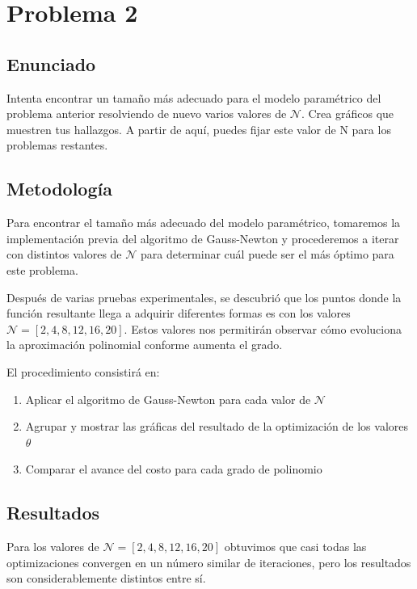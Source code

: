 \documentclass{article}
\begin{document}
\section{Problema 2}

\subsection{Enunciado}

Intenta encontrar un tamaño más adecuado para el modelo paramétrico del problema anterior resolviendo de nuevo varios valores de $\mathcal{N}$. Crea gráficos que muestren tus hallazgos. A partir de aquí, puedes fijar este valor de N para los problemas restantes.

\subsection{Metodología}

Para encontrar el tamaño más adecuado del modelo paramétrico, tomaremos la implementación previa del algoritmo de Gauss-Newton y procederemos a iterar con distintos valores de $\mathcal{N}$ para determinar cuál puede ser el más óptimo para este problema.

Después de varias pruebas experimentales, se descubrió que los puntos donde la función resultante llega a adquirir diferentes formas es con los valores $\mathcal{N} = [2, 4, 8, 12, 16, 20]$. Estos valores nos permitirán observar cómo evoluciona la aproximación polinomial conforme aumenta el grado.

El procedimiento consistirá en:
\begin{enumerate}
    \item Aplicar el algoritmo de Gauss-Newton para cada valor de $\mathcal{N}$
    \item Agrupar y mostrar las gráficas del resultado de la optimización de los valores $\theta$
    \item Comparar el avance del costo para cada grado de polinomio
\end{enumerate}

\subsection{Resultados}
\setcounter{equation}{0}

Para los valores de $\mathcal{N} = [2, 4, 8, 12, 16, 20]$ obtuvimos que casi todas las optimizaciones convergen en un número similar de iteraciones, pero los resultados son considerablemente distintos entre sí.
\end{document}
